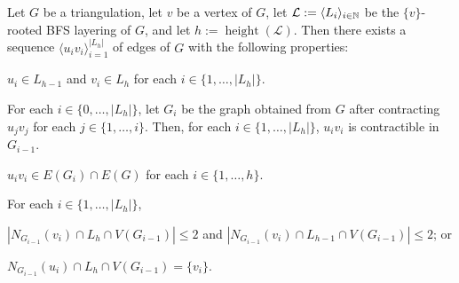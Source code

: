 \documentclass{patmorin}
\DeclareMathOperator{\height}{height}
\begin{document}
\begin{lem}\label{contraction_sequence}
    Let $G$ be a triangulation, let $v$ be a vertex of $G$, let $\mathcal{L}:=\langle L_i\rangle_{i\in\mathbb{N}}$ be the $\{v\}$-rooted BFS layering of $G$, and let $h:=\height(\mathcal{L})$.
    Then there exists a sequence $\langle u_iv_i\rangle_{i=1}^{|L_h|}$ of edges of $G$ with the following properties:
    \begin{compactenum}
        \item $u_i\in L_{h-1}$ and $v_i\in L_h$ for each $i\in\{1,\ldots,|L_h|\}$.
        \item For each $i\in\{0,\ldots,|L_h|\}$, let $G_i$ be the graph obtained from $G$ after contracting $u_jv_j$ for each $j\in\{1,\ldots,i\}$.  Then, for each $i\in\{1,\ldots,|L_h|\}$,  $u_iv_i$ is contractible in $G_{i-1}$.
        \item $u_iv_i\in E(G_i)\cap E(G)$ for each $i\in\{1,\ldots,h\}$.
        \item For each $i\in\{1,\ldots,|L_h|\}$,
        \begin{compactenum}[(a)]
            \item \label{low_degree}$|N_{G_{i-1}}(v_i)\cap L_h\cap V(G_{i-1})|\le 2$ and
                $|N_{G_{i-1}}(v_i)\cap L_{h-1}\cap V(G_{i-1})|\le 2$; or
            \item \label{only_child}$N_{G_{i-1}}(u_i)\cap L_h\cap V(G_{i-1})=\{v_i\}$.
        \end{compactenum}
    \end{compactenum}
\end{lem}
\end{document}
